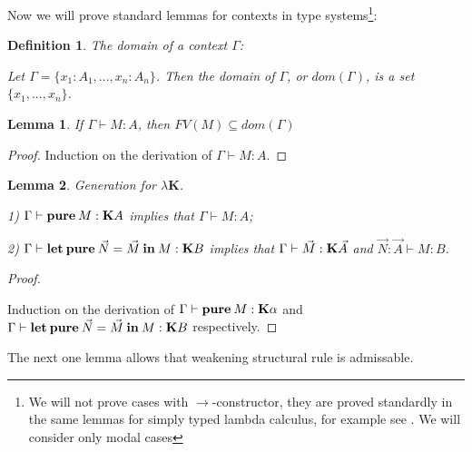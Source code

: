 \documentclass[a4paper]{article}
\newtheorem{lemma}{Lemma}
\newtheorem{defin}{Definition}
\begin{document}
  Now we will prove standard lemmas for contexts in type systems\footnote{We will not prove cases with
  $\to$-constructor, they are proved standardly in the same lemmas for simply typed lambda calculus, for
  example see \cite{Neder}\cite{Morten}\cite{Girard}. We will consider only modal cases}:

  \begin{defin} The domain of a context $\Gamma$:

  Let $\Gamma = \{ x_1 : A_1, ..., x_n : A_n \}$. Then the domain of $\Gamma$, or $dom(\Gamma)$, is a set $\{  x_1, ..., x_n\}$.

  \end{defin}

  \begin{lemma}

  If $\Gamma \vdash M : A$, then $FV(M) \subseteq dom(\Gamma)$

  \end{lemma}

  \begin{proof}

  Induction on the derivation of $\Gamma \vdash M : A$.

  \end{proof}

  \vspace{\baselineskip}

  \begin{lemma} Generation for $\lambda \textbf{K}$.

  1) $\Gamma \vdash {\bf pure \: } M : \textbf{K}A$ implies that $\Gamma \vdash M : A$;

  2) $\Gamma \vdash {\bf let \: pure} \: \vec{N} = \vec{M} \: {\bf in} \: M : {\bf K} B$ implies that $\Gamma \vdash \vec{M} : {\bf K} \vec{A}$ and
$\vec{N} : \vec{A} \vdash M : B$.
  \end{lemma}

  \begin{proof}

  $ $

Induction on the derivation of $\Gamma \vdash {\bf pure \: } M : \textbf{K}\alpha$ and $\Gamma \vdash {\bf let \: pure} \: \vec{N} = \vec{M} \: {\bf in} \: M : {\bf K} B$ respectively.
  \end{proof}

  \vspace{\baselineskip}

  The next one lemma allows that weakening structural rule is admissable.
\end{document}
